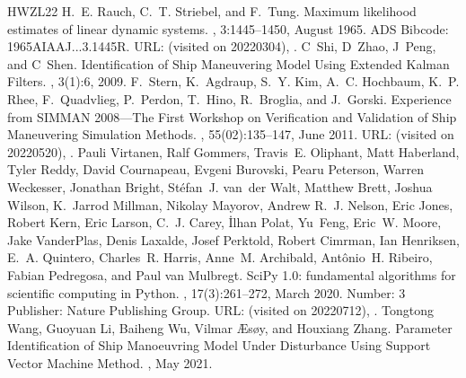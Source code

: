 \documentclass[review]{elsarticle}
\begin{document}
\begin{sphinxthebibliography}{HWZL22}
\sphinxAtStartPar
H. E. Rauch, C. T. Striebel, and F. Tung. Maximum likelihood estimates of linear dynamic systems. , 3:1445–1450, August 1965. ADS Bibcode: 1965AIAAJ...3.1445R. URL:  (visited on 2022\sphinxhyphen{}03\sphinxhyphen{}04), .
\sphinxAtStartPar
C Shi, D Zhao, J Peng, and C Shen. Identification of Ship Maneuvering Model Using Extended Kalman Filters. , 3(1):6, 2009.
\sphinxAtStartPar
F. Stern, K. Agdraup, S. Y. Kim, A. C. Hochbaum, K. P. Rhee, F. Quadvlieg, P. Perdon, T. Hino, R. Broglia, and J. Gorski. Experience from SIMMAN 2008—The First Workshop on Verification and Validation of Ship Maneuvering Simulation Methods. , 55(02):135–147, June 2011. URL:  (visited on 2022\sphinxhyphen{}05\sphinxhyphen{}20), .
\sphinxAtStartPar
Pauli Virtanen, Ralf Gommers, Travis E. Oliphant, Matt Haberland, Tyler Reddy, David Cournapeau, Evgeni Burovski, Pearu Peterson, Warren Weckesser, Jonathan Bright, Stéfan J. van der Walt, Matthew Brett, Joshua Wilson, K. Jarrod Millman, Nikolay Mayorov, Andrew R. J. Nelson, Eric Jones, Robert Kern, Eric Larson, C. J. Carey, İlhan Polat, Yu Feng, Eric W. Moore, Jake VanderPlas, Denis Laxalde, Josef Perktold, Robert Cimrman, Ian Henriksen, E. A. Quintero, Charles R. Harris, Anne M. Archibald, Antônio H. Ribeiro, Fabian Pedregosa, and Paul van Mulbregt. SciPy 1.0: fundamental algorithms for scientific computing in Python. , 17(3):261–272, March 2020. Number: 3 Publisher: Nature Publishing Group. URL:  (visited on 2022\sphinxhyphen{}07\sphinxhyphen{}12), .
\sphinxAtStartPar
Tongtong Wang, Guoyuan Li, Baiheng Wu, Vilmar Æsøy, and Houxiang Zhang. Parameter Identification of Ship Manoeuvring Model Under Disturbance Using Support Vector Machine Method. , May 2021.

\end{sphinxthebibliography}
\end{document}
